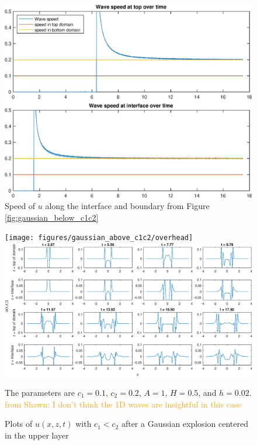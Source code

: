 \documentclass[11pt,letter,subeqn,fleqn]{article}
\numberwithin{equation}{section}
\numberwithin{table}{section}
\numberwithin{figure}{section}
\begin{document}
\begin{figure}[htbp]
	\caption{Speed of $u$ along the interface and boundary from Figure \ref{fig:gaussian_below_c1c2}}
	\label{fig:gaussian_below_c1c2_speed}
	\includegraphics[width=\linewidth]{figures/gaussian_below_c1c2/wavespeeds}
\footnotesize
\centering

\end{figure}



\begin{figure}[htbp]
	\caption{Plots of $u(x,z,t)$ with $c_1<c_2$ after a Gaussian explosion centered in the upper layer}
	\label{fig:gaussian_above_c1c2}
	\texttt{[image: figures/gaussian\_above\_c1c2/overhead]}
	\includegraphics[width=\linewidth]{figures/gaussian_above_c1c2/u_inter_boundary}
\footnotesize
\centering

The parameters are $c_1 = 0.1$, $c_2 = 0.2$, $A=1$, $H=0.5$, and $h = 0.02$. \textcolor{orange}{from Shawn: I don't think the 1D waves are insightful in this case}
\end{figure}
\end{document}
